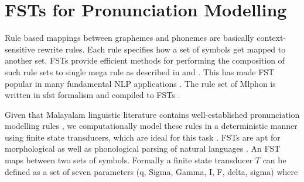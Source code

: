 

\section{FSTs for Pronunciation Modelling}


Rule based mappings between graphemes and phonemes are basically
context-sensitive rewrite rules. Each rule specifies how a set of symbols get mapped to another set. FSTs provide efficient methods for performing the composition of such rule sets to single mega rule as described in
\cite{kaplan1994regular} and \cite{karttunen1992two}. This has made FST popular in many fundamental NLP applications \cite{oflazer2006architecture,anberbir2011grapheme, mortensen2018epitran,thottingal2019finite,kayabacs2019trmor}. The rule set of Mlphon is written in \gls{sfst} formalism and compiled to FSTs \cite{schmid2005programming}.


Given that Malayalam linguistic literature contains well-established
pronunciation modelling rules \cite{mohanan1989syllable, asher1997, prabo2016},
we computationally model these rules in a deterministic manner using finite
state transducers, which are ideal for this task \cite{kaplan1994regular}. FSTs
are apt for morphological as well as phonological parsing of natural languages
\cite{kaplan1994regular}. An FST maps between two sets of symbols. Formally a
finite state transducer $T$ can be defined \cite{jurafsky2014speech} as a set
of seven parameters (\gls{q}, \gls{Sigma}, \gls{Gamma}, \gls{I}, \gls{F}, \gls{delta}, \gls{sigma}) where

